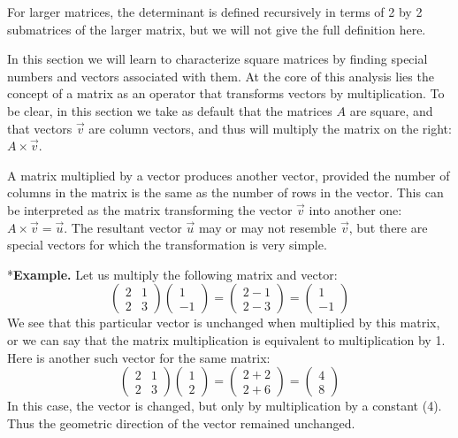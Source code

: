 \documentclass[
]{book}
\theoremstyle{definition}
\theoremstyle{definition}
\theoremstyle{definition}
\theoremstyle{remark}
\begin{document}
For larger matrices, the determinant is defined recursively in terms of 2 by 2 submatrices of the larger matrix, but we will not give the full definition here.

In this section we will learn to characterize square matrices by finding special numbers and vectors associated with them. At the core of this analysis lies the concept of a matrix as an operator that transforms vectors by multiplication. To be clear, in this section we take as default that the matrices \(A\) are square, and that vectors \(\vec v\) are column vectors, and thus will multiply the matrix on the right: \(A \times \vec v\).

A matrix multiplied by a vector produces another vector, provided the number of columns in the matrix is the same as the number of rows in the vector. This can be interpreted as the matrix transforming the vector \(\vec v\) into another one: \(A \times \vec v = \vec u\). The resultant vector \(\vec u\) may or may not resemble \(\vec v\), but there are special vectors for which the transformation is very simple.

*\textbf{Example.} Let us multiply the following matrix and vector:
\[ 
\left(\begin{array}{cc}2 & 1 \\ 2& 3\end{array}\right)\left(\begin{array}{c}1 \\ -1 \end{array}\right) = \left(\begin{array}{c}2 -1 \\ 2 - 3 \end{array}\right) =  \left(\begin{array}{c} 1 \\ -1 \end{array}\right) 
\]
We see that this particular vector is unchanged when multiplied by this matrix, or we can say that the matrix multiplication is equivalent to multiplication by 1. Here is another such vector for the same matrix:
\[ 
 \left(\begin{array}{cc}2 & 1 \\ 2& 3\end{array}\right)\left(\begin{array}{c}1 \\ 2 \end{array}\right) = \left(\begin{array}{c}2 +2 \\ 2 + 6 \end{array}\right) =  \left(\begin{array}{c} 4 \\ 8 \end{array}\right) 
\]
In this case, the vector is changed, but only by multiplication by a constant (4). Thus the geometric direction of the vector remained unchanged.
\end{document}

